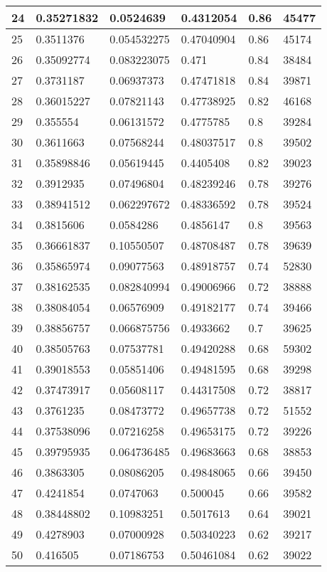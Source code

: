 \begin{longtable}{|l|l|l|l|l|l|}
24 & 0.35271832 & 0.0524639 & 0.4312054 & 0.86 & 45477 \\ \hline 
25 & 0.3511376 & 0.054532275 & 0.47040904 & 0.86 & 45174 \\ \hline 
26 & 0.35092774 & 0.083223075 & 0.471 & 0.84 & 38484 \\ \hline 
27 & 0.3731187 & 0.06937373 & 0.47471818 & 0.84 & 39871 \\ \hline 
28 & 0.36015227 & 0.07821143 & 0.47738925 & 0.82 & 46168 \\ \hline 
29 & 0.355554 & 0.06131572 & 0.4775785 & 0.8 & 39284 \\ \hline 
30 & 0.3611663 & 0.07568244 & 0.48037517 & 0.8 & 39502 \\ \hline 
31 & 0.35898846 & 0.05619445 & 0.4405408 & 0.82 & 39023 \\ \hline 
32 & 0.3912935 & 0.07496804 & 0.48239246 & 0.78 & 39276 \\ \hline 
33 & 0.38941512 & 0.062297672 & 0.48336592 & 0.78 & 39524 \\ \hline 
34 & 0.3815606 & 0.0584286 & 0.4856147 & 0.8 & 39563 \\ \hline 
35 & 0.36661837 & 0.10550507 & 0.48708487 & 0.78 & 39639 \\ \hline 
36 & 0.35865974 & 0.09077563 & 0.48918757 & 0.74 & 52830 \\ \hline 
37 & 0.38162535 & 0.082840994 & 0.49006966 & 0.72 & 38888 \\ \hline 
38 & 0.38084054 & 0.06576909 & 0.49182177 & 0.74 & 39466 \\ \hline 
39 & 0.38856757 & 0.066875756 & 0.4933662 & 0.7 & 39625 \\ \hline 
40 & 0.38505763 & 0.07537781 & 0.49420288 & 0.68 & 59302 \\ \hline 
41 & 0.39018553 & 0.05851406 & 0.49481595 & 0.68 & 39298 \\ \hline 
42 & 0.37473917 & 0.05608117 & 0.44317508 & 0.72 & 38817 \\ \hline 
43 & 0.3761235 & 0.08473772 & 0.49657738 & 0.72 & 51552 \\ \hline 
44 & 0.37538096 & 0.07216258 & 0.49653175 & 0.72 & 39226 \\ \hline 
45 & 0.39795935 & 0.064736485 & 0.49683663 & 0.68 & 38853 \\ \hline 
46 & 0.3863305 & 0.08086205 & 0.49848065 & 0.66 & 39450 \\ \hline 
47 & 0.4241854 & 0.0747063 & 0.500045 & 0.66 & 39582 \\ \hline 
48 & 0.38448802 & 0.10983251 & 0.5017613 & 0.64 & 39021 \\ \hline 
49 & 0.4278903 & 0.07000928 & 0.50340223 & 0.62 & 39217 \\ \hline 
50 & 0.416505 & 0.07186753 & 0.50461084 & 0.62 & 39022 \\ \hline 
\end{longtable}